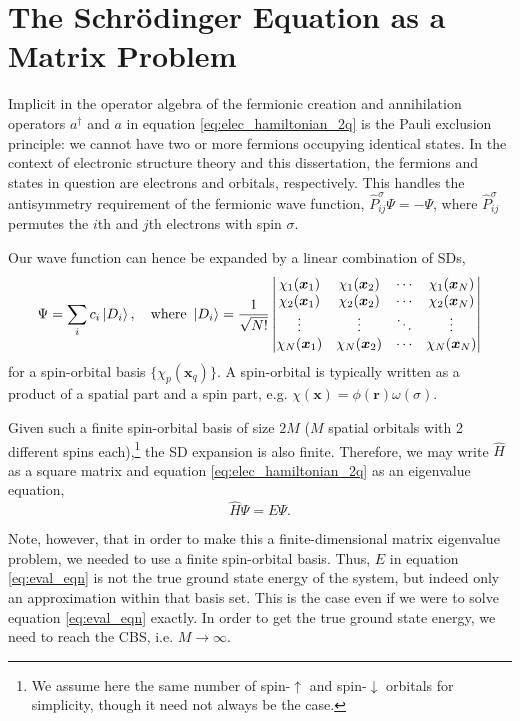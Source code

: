 \section{The Schr\"odinger Equation as a Matrix Problem}
\label{sec:matrix}

Implicit in the operator algebra of the fermionic creation and annihilation operators $a^\dag$ and $a$ in equation \eqref{eq:elec_hamiltonian_2q} is the Pauli exclusion principle: we cannot have two or more fermions occupying identical states. In the context of electronic structure theory and this dissertation, the fermions and states in question are electrons and orbitals, respectively. This handles the antisymmetry requirement of the fermionic wave function, $\hat P_{ij}^\sigma\Psi = -\Psi$, where $\hat P_{ij}^\sigma$ permutes the $i$th and $j$th electrons with spin $\sigma$.

Our wave function can hence be expanded by a linear combination of \glspl{SD},
\begin{equation}
    \label{eq:SD_expansion}
\Psi = \sum_i c_i \ket{D_i},
\quad \text{where } \ket{D_i} =
\frac 1{\sqrt{N!}}\left|
    \begin{matrix}
        \chi_1(\bm x_1) & \chi_1(\bm x_2) & \cdots & \chi_1(\bm x_N)\\
        \chi_2(\bm x_1) & \chi_2(\bm x_2) & \cdots & \chi_2(\bm x_N)\\
        \vdots & \vdots & \ddots & \vdots\\
        \chi_N(\bm x_1) & \chi_N(\bm x_2) & \cdots & \chi_N(\bm x_N)\\
    \end{matrix}
 \right|
\end{equation}
for a spin-orbital basis $\{\chi_p(\bm x_q)\}$. A spin-orbital is typically written as a product of a spatial part and a spin part, e.g. $\chi(\bm x) = \phi(\bm r)\omega(\sigma)$.

Given such a finite spin-orbital basis of size $2M$ ($M$ spatial orbitals with 2 different spins each),\footnote{We assume here the same number of spin-$\uparrow$ and spin-$\downarrow$ orbitals for simplicity, though it need not always be the case.} the \gls{SD} expansion is also finite. Therefore, we may write $\hat H$ as a square matrix and equation \eqref{eq:elec_hamiltonian_2q} as an eigenvalue equation,
\begin{equation}
\label{eq:eval_eqn}
\hat H\Psi = E\Psi.
\end{equation}

Note, however, that in order to make this a finite-dimensional matrix eigenvalue problem, we needed to use a finite spin-orbital basis. Thus, $E$ in equation \eqref{eq:eval_eqn} is not the true ground state energy of the system, but indeed only an approximation within that basis set. This is the case even if we were to solve equation \eqref{eq:eval_eqn} exactly. In order to get the true ground state energy, we need to reach the \gls{CBS}, i.e. $M\to\infty$.


